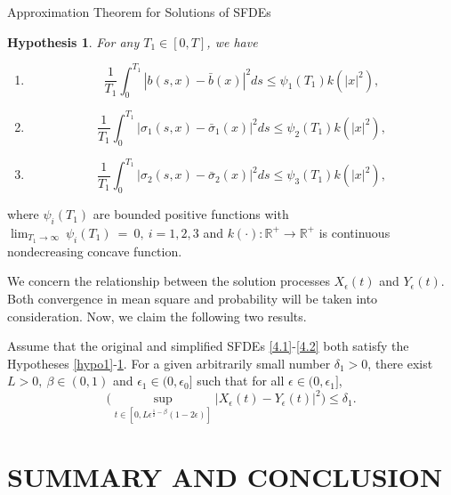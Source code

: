\documentclass[unknownkeysallowed, compress]{beamer}
\newtheorem{hypothesis}[theorem]{\textbf{Hypothesis}}
\theoremstyle{plain}
\begin{document}
\begin{frame}[allowframebreaks]{Approximation Theorem for Solutions of SFDEs}
\begin{hypothesis}\label{hypo3}
\normalfont
For any $T_1\in[0,T]$, we have
\begin{enumerate}
\item[(i)]
$$
\frac{1}{T_1}\int_0^{T_1}|b(s,x) - \bar{b}(x)|^2ds\leq \psi_1(T_1)k(|x|^2),
$$
\item[(ii)]
$$
\frac{1}{T_1}\int_0^{T_1}|\sigma_1(s,x) - \bar{\sigma}_1(x)|^2ds\leq \psi_2(T_1)k(|x|^2),
$$
\item[(iii)]
$$
\frac{1}{T_1}\int_0^{T_1}|\sigma_2(s,x) - \bar{\sigma}_2(x)|^2ds\leq \psi_3(T_1)k(|x|^2),
$$
\end{enumerate}
\end{hypothesis}
where $\psi_i(T_1)$ are bounded positive functions with $\lim_{T_1\rightarrow\infty}~\psi_i(T_1)~ = ~ 0,~i = 1,2,3$ and $k(\cdot):\mathbb{R}^+\rightarrow\mathbb{R}^+$ is continuous nondecreasing concave function.
\noindent
\par We concern the relationship between the solution processes $X_\epsilon(t)$ and $Y_\epsilon(t)$.\\
Both convergence in mean square and probability will be taken into consideration.
Now, we claim the following two results.
\begin{theorem}\label{4.1}
Assume that the original and simplified SFDEs \eqref{4.1}-\eqref{4.2} both satisfy the Hypotheses \ref{hypo1}-\ref{hypo3}. For a given arbitrarily small number $\delta_1>0$, there exist $L>0,~\beta\in(0,1)$ and $\epsilon_1\in (0,\epsilon_0]$ such that for all $\epsilon\in(0,\epsilon_1]$,
$$
\bigg(\sup_{t\in[0,L\epsilon^{\frac{1}{2} -\beta}(1-2\epsilon)]}|X_\epsilon(t) - Y_\epsilon(t)|^2\bigg)\leq \delta_1.
$$
\end{theorem}
\end{frame}
\section{SUMMARY AND CONCLUSION}
\end{document}
